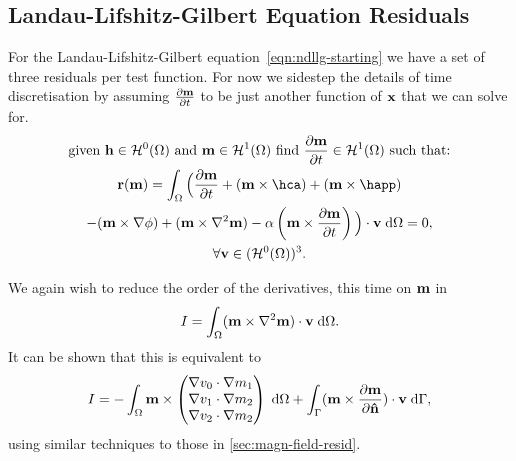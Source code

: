 
\subsection{Landau-Lifshitz-Gilbert Equation Residuals}

For the Landau-Lifshitz-Gilbert equation~\eqref{eqn:ndllg-starting} we have a set of three residuals per test function. For now we sidestep the details of time discretisation by assuming $\frac{\partial \mathbf{m}}{\partial t}$ to be just another function of $\mathbf{x}$ that we can solve for.
\begin{gather}
  \text{given $\hv \in \sob^0(\magd)$ and $\mv \in \sob^1(\magd)$ find $\dmdt \in \sob^1(\magd)$ such that:} \notag
  \\
  \rllg(\mv) = \int_\magd \Big( \dmdt
  + (\mv \times \hca) + (\mv \times \happ) \\
  - (\mv \times \nabla \phi) + (\mv \times \lap \mv)
  - \dampc \left( \mv \times \dmdt \right)
  \Big) \cdot \testv \d\magd
  = 0, \label{res:contllg}
  \\
  \forall \testv \in (\sob^0(\magd))^3. \notag
\end{gather}

We again wish to reduce the order of the derivatives, this time on $\mathbf{m}$ in
\begin{equation}
  I = \int_\Omega (\mathbf{m} \times \nabla^2 \mathbf{m}) \cdot \mathbf{v} {\; \text{d}}\Omega.
  \label{eq:46}
\end{equation}
It can be shown that this is equivalent to
\begin{equation}
  \label{eq:49}
  I = - \int_\Omega  \mathbf{m} \times \begin{pmatrix} \nabla v_0 \cdot \nabla m_1 \\ \nabla v_1 \cdot \nabla m_2 \\ \nabla v_2 \cdot \nabla m_2 \end{pmatrix} {\; \text{d}}\Omega 
  + \int_{\Gamma} (\mathbf{m} \times \frac{\partial \mathbf{m}}{\partial \mathbf{\hat{n}}}) \cdot \mathbf{v} {\; \text{d}}{\Gamma},
\end{equation}
using similar techniques to those in \autoref{sec:magn-field-resid}. %

